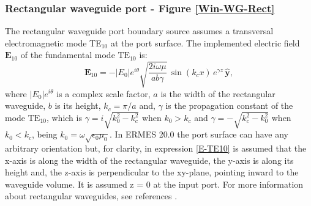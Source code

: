 \subsubsection{Rectangular waveguide port - Figure \ref{Win-WG-Rect}}\label{bsRWPort}

The rectangular waveguide port boundary source assumes a transversal electromagnetic mode TE$_{10}$ at the port surface. The implemented electric field $\mathbf{E}_{10}$ of the fundamental mode $\text{TE}_{10}$ is:
\begin{equation}\label{E-TE10}
	\mathbf{E}_{10} = -|E_{0}|e^{i\theta}\sqrt{\frac{2i\omega\mu}{ab\gamma}}\,\sin(k_{c}x)\,e^{\gamma z}\,\mathbf{\hat{y}},
\end{equation}
where $|E_{0}|e^{i\theta}$ is a complex scale factor, $a$ is the width of the rectangular waveguide, $b$ is its height, $k_{c} = \pi / a$ and, $\gamma$ is the propagation constant of the mode $\text{TE}_{10}$, which is $\gamma = i\sqrt{k_{0}^2 - k_{c}^2}$ when $k_{0} > k_{c}$ and $\gamma = -\sqrt{k_{c}^2 - k_{0}^2}$ when $k_{0} < k_{c}$, being $k_{0} = \omega\sqrt{\epsilon_{0}\mu_{0}}$. In ERMES 20.0 the port surface can have any arbitrary orientation but, for clarity, in expression \eqref{E-TE10} is assumed that the x-axis is along the width of the rectangular waveguide, the y-axis is along its height and, the z-axis is perpendicular to the xy-plane, pointing inward to the waveguide volume. It is assumed z = 0 at the input port. For more information about rectangular waveguides, see references \cite{Pozar, Balanis}. 

